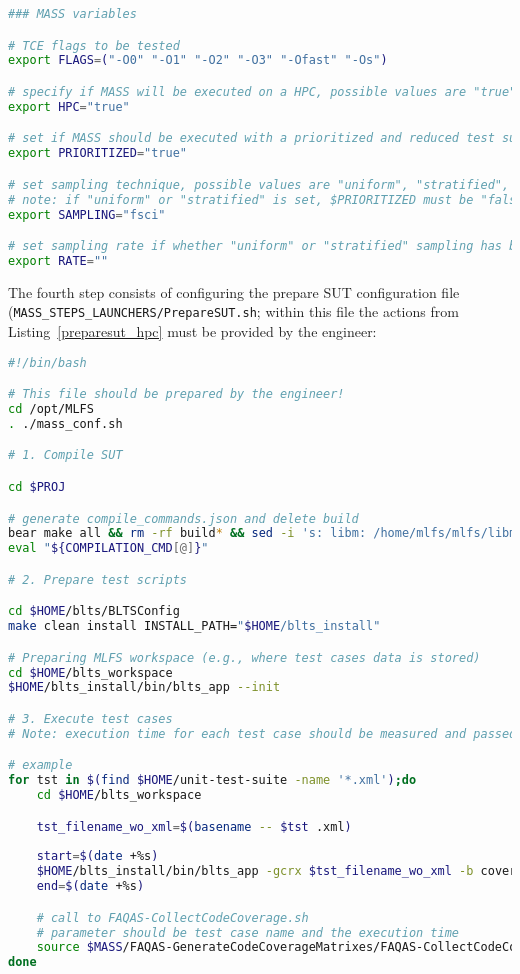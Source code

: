 \begin{lstlisting}[language=bash, label=mutation_additional_hpc_mass ,caption=\MASS specific variables. Excerpt of mass\_conf.sh file.]
### MASS variables

# TCE flags to be tested 
export FLAGS=("-O0" "-O1" "-O2" "-O3" "-Ofast" "-Os")

# specify if MASS will be executed on a HPC, possible values are "true" or "false"
export HPC="true"

# set if MASS should be executed with a prioritized and reduced test suite
export PRIORITIZED="true"

# set sampling technique, possible values are "uniform", "stratified", and "fsci"
# note: if "uniform" or "stratified" is set, $PRIORITIZED must be "false"
export SAMPLING="fsci"

# set sampling rate if whether "uniform" or "stratified" sampling has been selected
export RATE=""
\end{lstlisting}

The fourth step consists of configuring the prepare SUT configuration file \\(\texttt{MASS\_STEPS\_LAUNCHERS/PrepareSUT.sh}; within this file the actions from Listing~\ref{preparesut_hpc} must be provided by the engineer:

\begin{lstlisting}[language=bash, label=preparesut_hpc ,caption=\MASS PrepareSUT.sh file.]
#!/bin/bash

# This file should be prepared by the engineer!
cd /opt/MLFS
. ./mass_conf.sh

# 1. Compile SUT

cd $PROJ

# generate compile_commands.json and delete build
bear make all && rm -rf build* && sed -i 's: libm: /home/mlfs/mlfs/libm:' compile_commands.json && mv compile_commands.json $MUTANTS_DIR
eval "${COMPILATION_CMD[@]}"

# 2. Prepare test scripts

cd $HOME/blts/BLTSConfig
make clean install INSTALL_PATH="$HOME/blts_install"

# Preparing MLFS workspace (e.g., where test cases data is stored)
cd $HOME/blts_workspace
$HOME/blts_install/bin/blts_app --init

# 3. Execute test cases
# Note: execution time for each test case should be measured and passed as argument to FAQAS-CollectCodeCoverage.sh

# example
for tst in $(find $HOME/unit-test-suite -name '*.xml');do
    cd $HOME/blts_workspace

    tst_filename_wo_xml=$(basename -- $tst .xml)
    
    start=$(date +%s)
    $HOME/blts_install/bin/blts_app -gcrx $tst_filename_wo_xml -b coverage --nocsv -s $tst
    end=$(date +%s)    

    # call to FAQAS-CollectCodeCoverage.sh
    # parameter should be test case name and the execution time
    source $MASS/FAQAS-GenerateCodeCoverageMatrixes/FAQAS-CollectCodeCoverage.sh $tst_filename_wo_xml "$(($end-$start))"
done
\end{lstlisting}

